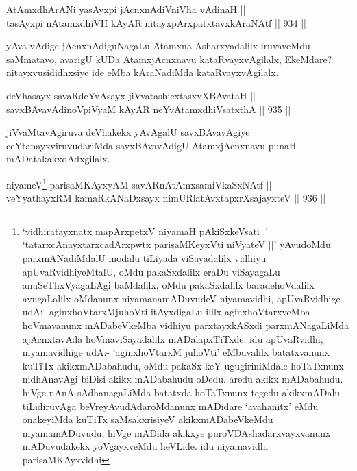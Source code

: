 
\begin{shl}
AtAmxdhArANi yasAyxpi jAcnxnAdiVniVha vAdinaH || \\
tasAyxpi nA\s \s tamxdhiVH kAyAR nitayxpArxpatxtavxkAraNAtf \hfill || 934 ||  
\end{shl}

\begin{artha}
yAva vAdige jAcnxnAdiguNagaLu Atamxna Asharxyadalilx iruvaveMdu saMmatavo, avarigU kUDa AtamxjAcnxnavu kataRvayxvAgilalx, EkeMdare? nitayxvusididhxsiye ide eMba kAraNadiMda kataRvayxvAgilalx.
\end{artha}


\begin{shl}
deVhasayx savaRdeYvAsayx jiVvatashicxtasxvXBAvataH ||  \\
savxBAvavAdinoV\s piVyaM kAyAR neYvA\s \s tamxdhiVsatxthA \hfill || 935 ||  
\end{shl}

\begin{artha}
jiVvaMtavAgiruva deVhakekx yAvAgalU savxBAvavAgiye ceYtanayxviruvudariMda savxBAvavAdigU AtamxjAcnxnavu punaH mADatakakxdAdxgilalx.
\end{artha}



\begin{shl}
niyameV\footnote{`vidhiratayxnatx mapArxpetxV niyamaH pAkiSxkeVsati |' `tatarxcAnayxtarxcadArxpwtx parisaMKeyxVti niVyateV ||' yAvudoMdu parxmANadiMdalU modalu tiLiyada viSayadalilx vidhiyu apUvaRvidhiyeMtalU, oMdu pakaSxdalilx eraDu viSayagaLu anuSeThxVyagaLAgi baMdalilx, oMdu pakaSxdalilx baradehoVdalilx avugaLalilx oMdanunx niyamanamADuvudeV niyamavidhi, apUvaRvidhige udA:- aginxhoVtarxMjuhoVti itAyxdigaLu ililx aginxhoVtarxveMba hoVmavanunx mADabeVkeMba vidhiyu parxtayxkASxdi parxmANagaLiMda ajAcnxtavAda hoVmaviSayadalilx mADalapxTiTxde. idu apUvaRvidhi, niyamavidhige udA:- `aginxhoVtarxM juhoVti' eMbuvalilx batatxvanunx kuTiTx akikxmADabahudu, oMdu pakaSx keY ugugiriniMdale hoTaTxnunx nidhAnavAgi biDisi akikx mADabahudu oDedu. aredu akikx mADabahudu. hiVge nAnA sAdhanagaLiMda batatxda hoTaTxnunx tegedu akikxmADalu tiLidiruvAga beVreyAvudAdaroMdanunx mADidare `avahanitx' eMdu onakeyiMda kuTiTx saMsakxrisiyeV akikxmADabeVkeMdu niyamamADuvudu, hiVge mADida akikxye puroVDAshadarxvayxvanunx mADuvudakekx yoVgayxveMdu heVLide. idu niyamavidhi parisaMKAyxvidhi} parisaMKAyxyAM savARnAtAmxsamiVkaSxNAtf || \\
veYyathayxRM kamaRkANaDxsayx nimURlatAvxtapxrXsajayxteV \hfill || 936 ||  
\end{shl}

